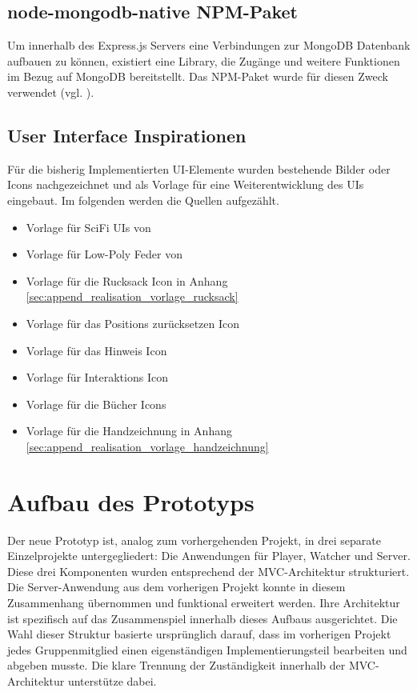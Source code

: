 \subsection{node-mongodb-native NPM-Paket}
Um innerhalb des Express.js Servers eine Verbindungen zur MongoDB Datenbank aufbauen zu können, existiert eine Library, die Zugänge und weitere Funktionen im Bezug auf MongoDB bereitstellt. Das \ac{NPM}-Paket  wurde für diesen Zweck verwendet (vgl. \citealp{mongodb_mongodbnode-mongodb-native_2025}).


\subsection{User Interface Inspirationen}
Für die bisherig Implementierten \ac{UI}-Elemente wurden bestehende Bilder oder Icons nachgezeichnet und als Vorlage für eine Weiterentwicklung des \ac{UI}s eingebaut. Im folgenden werden die Quellen aufgezählt.

\begin{itemize}
    \item Vorlage für SciFi \ac{UI}s von \cite{pchvector_free_nodate}
    \item Vorlage für Low-Poly Feder von \cite{masud_download_nodate}
    \item Vorlage für die Rucksack Icon in Anhang \ref{sec:append_realisation_vorlage_rucksack}
    \item Vorlage für das Positions zurücksetzen Icon \cite{noauthor_chatgpt_nodate-3}
    \item Vorlage für das Hinweis Icon \cite{noauthor_chatgpt_nodate-2}
    \item Vorlage für Interaktions Icon \cite{noauthor_chatgpt_nodate-1}
    \item Vorlage für die Bücher Icons \cite{noauthor_chatgpt_nodate}
    \item Vorlage für die Handzeichnung in Anhang \ref{sec:append_realisation_vorlage_handzeichnung}
\end{itemize}

\section{Aufbau des Prototyps}

Der neue Prototyp ist, analog zum vorhergehenden Projekt, in drei separate Einzelprojekte untergegliedert: Die Anwendungen für Player, Watcher und Server. Diese drei Komponenten wurden entsprechend der \ac{MVC}-Architektur strukturiert. Die Server-Anwendung aus dem vorherigen Projekt konnte in diesem Zusammenhang übernommen und funktional erweitert werden. Ihre Architektur ist spezifisch auf das Zusammenspiel innerhalb dieses Aufbaus ausgerichtet. Die Wahl dieser Struktur basierte ursprünglich darauf, dass im vorherigen Projekt jedes Gruppenmitglied einen eigenständigen Implementierungsteil bearbeiten und abgeben musste. Die klare Trennung der Zuständigkeit innerhalb der \ac{MVC}-Architektur unterstütze dabei.

